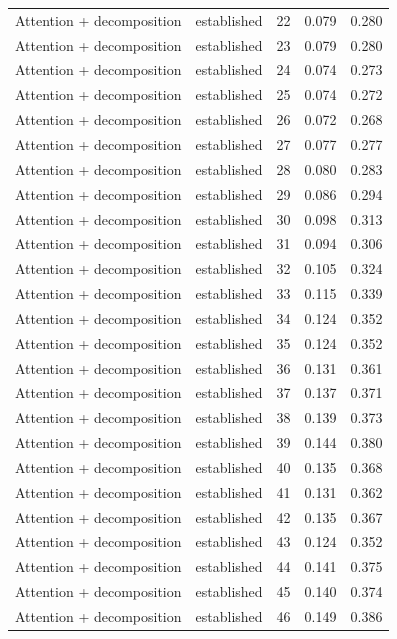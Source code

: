 \begin{tabular}{llrrr}
Attention + decomposition & established & 22 & 0.079 & 0.280 \\
Attention + decomposition & established & 23 & 0.079 & 0.280 \\
Attention + decomposition & established & 24 & 0.074 & 0.273 \\
Attention + decomposition & established & 25 & 0.074 & 0.272 \\
Attention + decomposition & established & 26 & 0.072 & 0.268 \\
Attention + decomposition & established & 27 & 0.077 & 0.277 \\
Attention + decomposition & established & 28 & 0.080 & 0.283 \\
Attention + decomposition & established & 29 & 0.086 & 0.294 \\
Attention + decomposition & established & 30 & 0.098 & 0.313 \\
Attention + decomposition & established & 31 & 0.094 & 0.306 \\
Attention + decomposition & established & 32 & 0.105 & 0.324 \\
Attention + decomposition & established & 33 & 0.115 & 0.339 \\
Attention + decomposition & established & 34 & 0.124 & 0.352 \\
Attention + decomposition & established & 35 & 0.124 & 0.352 \\
Attention + decomposition & established & 36 & 0.131 & 0.361 \\
Attention + decomposition & established & 37 & 0.137 & 0.371 \\
Attention + decomposition & established & 38 & 0.139 & 0.373 \\
Attention + decomposition & established & 39 & 0.144 & 0.380 \\
Attention + decomposition & established & 40 & 0.135 & 0.368 \\
Attention + decomposition & established & 41 & 0.131 & 0.362 \\
Attention + decomposition & established & 42 & 0.135 & 0.367 \\
Attention + decomposition & established & 43 & 0.124 & 0.352 \\
Attention + decomposition & established & 44 & 0.141 & 0.375 \\
Attention + decomposition & established & 45 & 0.140 & 0.374 \\
Attention + decomposition & established & 46 & 0.149 & 0.386 \\

\end{tabular}
